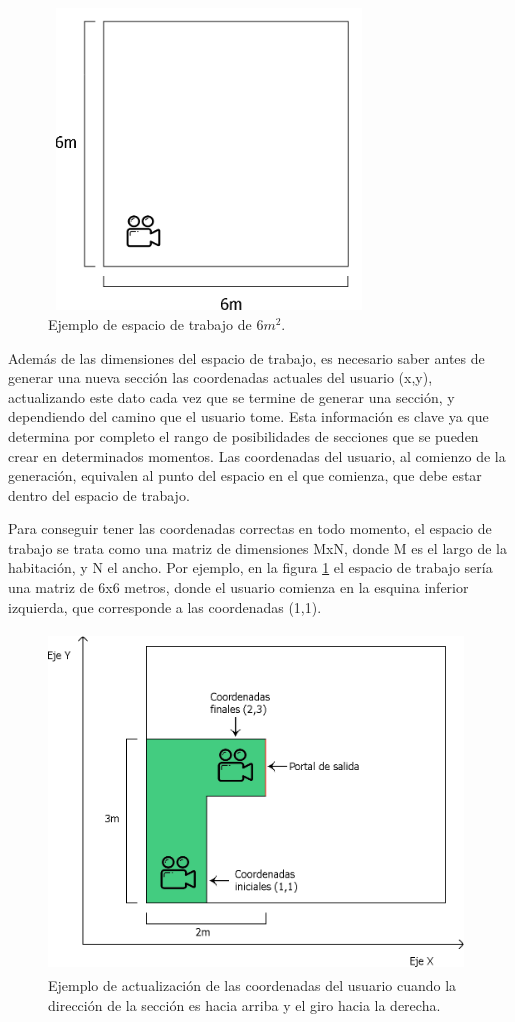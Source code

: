 \documentclass[../main.tex]{subfiles}
\begin{document}
\begin{figure}[h!]
\centering
\includegraphics[width=8.5cm, height=8cm]{imagenes/Workspace_Example.png}
\caption{Ejemplo de espacio de trabajo de $6m^2$.}
\label{fig:Workspace_Example}
\end{figure}

Además de las dimensiones del espacio de trabajo, es necesario saber antes de generar una nueva sección las coordenadas actuales del usuario (x,y), actualizando este dato cada vez que se termine de generar una sección, y dependiendo del camino que el usuario tome. Esta información es clave ya que determina por completo el rango de posibilidades de secciones que se pueden crear en determinados momentos. Las coordenadas del usuario, al comienzo de la generación, equivalen al punto del espacio en el que comienza, que debe estar dentro del espacio de trabajo.

Para conseguir tener las coordenadas correctas en todo momento, el espacio de trabajo se trata como una matriz de dimensiones MxN, donde M es el largo de la habitación, y N el ancho. Por ejemplo, en la figura \ref{fig:Workspace_Example} el espacio de trabajo sería una matriz de 6x6 metros, donde el usuario comienza en la esquina inferior izquierda, que corresponde a las coordenadas (1,1).


\begin{figure}[h!]
\centering
\includegraphics[width=11cm, height=9cm]{imagenes/Coordinates_Update_Example.png}
\caption{Ejemplo de actualización de las coordenadas del usuario cuando la dirección de la sección es hacia arriba y el giro hacia la derecha.}
\label{fig:Coordinates_Update_Example}
\end{figure}
\end{document}
